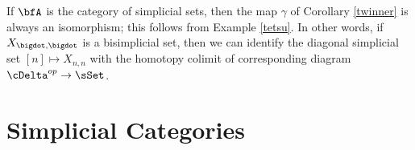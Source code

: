 \begin{Model Categories}
\begin{Didn't Read}
\begin{example}\label{swupt}
If $\bfA$ is the category of simplicial sets, then the map $\gamma$ of Corollary \ref{twinner}
is always an isomorphism; this follows from Example \ref{tetsu}. In other words, if
$X_{\bigdot, \bigdot}$ is a bisimplicial set, then we can identify the diagonal simplicial set
$[n] \mapsto X_{n,n}$ with the homotopy colimit of corresponding diagram
$\cDelta^{op} \rightarrow \sSet$.
\end{example}
\end{Didn't Read}
\end{Model Categories}

\section{Simplicial Categories}\label{techapp}

